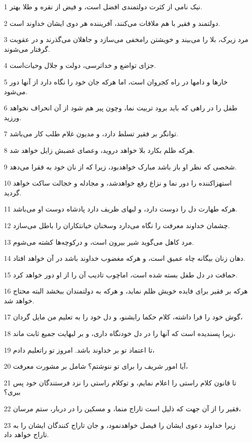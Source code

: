 \par 1 نیک نامی از کثرت دولتمندی افضل است، و فیض از نقره و طلا بهتر.
\par 2 دولتمند و فقیر با هم ملاقات می‌کنند، آفریننده هر دوی ایشان خداوند است.
\par 3 مرد زیرک، بلا را می‌بیند و خویشتن رامخفی می‌سازد و جاهلان می‌گذرند و در عقوبت گرفتار می‌شوند.
\par 4 جزای تواضع و خداترسی، دولت و جلال وحیات‌است.
\par 5 خارها و دامها در راه کجروان است، اما هرکه جان خود را نگاه دارد از آنها دور می‌شود.
\par 6 طفل را در راهی که باید برود تربیت نما، وچون پیر هم شود از آن انحراف نخواهد ورزید.
\par 7 توانگر بر فقیر تسلط دارد، و مدیون غلام طلب کار می‌باشد.
\par 8 هر‌که ظلم بکارد بلا خواهد دروید، وعصای غضبش زایل خواهد شد.
\par 9 شخصی که نظر او باز باشد مبارک خواهدبود، زیرا که از نان خود به فقرا می‌دهد.
\par 10 استهزاکننده را دور نما و نزاع رفع خواهدشد، و مجادله و خجالت ساکت خواهد گردید.
\par 11 هر‌که طهارت دل را دوست دارد، و لبهای ظریف دارد پادشاه دوست او می‌باشد.
\par 12 چشمان خداوند معرفت را نگاه می‌دارد وسخنان خیانتکاران را باطل می‌سازد.
\par 13 مرد کاهل می‌گوید شیر بیرون است، و درکوچه‌ها کشته می‌شوم.
\par 14 دهان زنان بیگانه چاه عمیق است، و هر‌که مغضوب خداوند باشد در آن خواهد افتاد.
\par 15 حماقت در دل طفل بسته شده است، اماچوب تادیب آن را از او دور خواهد کرد.
\par 16 هر‌که بر فقیر برای فایده خویش ظلم نماید، و هر‌که به دولتمندان ببخشد البته محتاج خواهد شد.
\par 17 گوش خود را فرا داشته، کلام حکما رابشنو، و دل خود را به تعلیم من مایل گردان،
\par 18 زیرا پسندیده است که آنها را در دل خودنگاه داری، و بر لبهایت جمیع ثابت ماند،
\par 19 تا اعتماد تو بر خداوند باشد. امروز تو راتعلیم دادم،
\par 20 آیا امور شریف را برای تو ننوشتم؟ شامل بر مشورت معرفت،
\par 21 تا قانون کلام راستی را اعلام نمایم، و توکلام راستی را نزد فرستندگان خود پس ببری؟
\par 22 فقیر را از آن جهت که ذلیل است تاراج منما، و مسکین را در دربار، ستم مرسان،
\par 23 زیرا خداوند دعوی ایشان را فیصل خواهدنمود، و جان تاراج کنندگان ایشان را به تاراج خواهد داد.
